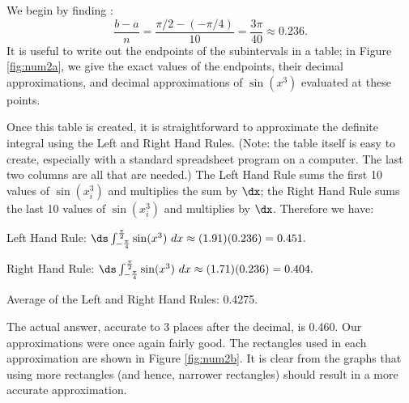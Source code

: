 {We begin by finding \dx:
$$\frac{b-a}{n} = \frac{\pi/2 - (-\pi/4)}{10} = \frac{3\pi}{40}\approx 0.236.$$
It is useful to write out the endpoints of the subintervals in a table; in Figure \ref{fig:num2a}, we give the exact values of the endpoints, their decimal approximations, and decimal approximations of $\sin(x^3)$ evaluated at these points. 

Once this table is created, it is straightforward to approximate the definite integral using the Left and Right Hand Rules. (Note: the table itself is easy to create, especially with a standard spreadsheet program on a computer. The last two columns are all that are needed.) The Left Hand Rule sums the first 10 values of $\sin(x_i^3)$ and multiplies the sum by $\dx$; the Right Hand Rule sums the last 10 values of $\sin(x_i^3)$ and multiplies by $\dx$. Therefore we have:

Left Hand Rule: $\ds \int_{-\frac{\pi}4}^{\frac{\pi}2}\sin(x^3)\ dx \approx (1.91)(0.236) = 0.451.$

Right Hand Rule: $\ds \int_{-\frac{\pi}4}^{\frac{\pi}2}\sin(x^3)\ dx \approx (1.71)(0.236) = 0.404.$

Average of the Left and Right Hand Rules: 0.4275.


The actual answer, accurate to 3 places after the decimal, is 0.460. Our approximations were once again fairly good. The rectangles used in each approximation are shown in Figure \ref{fig:num2b}. It is clear from the graphs that using more rectangles (and hence, narrower rectangles) should result in a more accurate approximation.}

